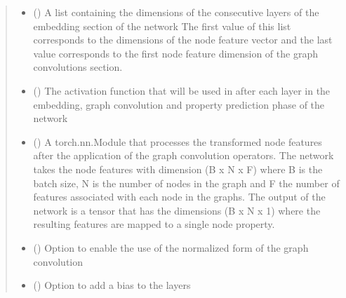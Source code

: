 \documentclass[letterpaper,10pt,english]{sphinxmanual}
\begin{document}
\begin{fulllineitems}
\begin{quote}
\begin{description}
\begin{itemize}
\item {} 
 () \textendash{} A list containing the dimensions of the consecutive layers of the embedding section of the network
The first value of this list corresponds to the dimensions of the node feature vector and the last
value corresponds to the first node feature dimension of the graph convolutions section.

\item {} 
 () \textendash{} The activation function that will be used in after each layer in the embedding, graph convolution
and property prediction phase of the network

\item {} 
 () \textendash{} A torch.nn.Module that processes the transformed node features after the application
of the graph convolution operators. The network takes the node features with dimension
(B x N x F) where B is the batch size, N is the number of nodes in the graph and F
the number of features associated with each node in the graphs. The output of the network
is a tensor that has the dimensions (B x N x 1) where the resulting features are
mapped to a single node property.

\item {} 
 (\sphinxstyleliteralemphasis{\sphinxupquote{, }}) \textendash{} Option to enable the use of the normalized form of the graph convolution

\item {} 
 (\sphinxstyleliteralemphasis{\sphinxupquote{, }}) \textendash{} Option to add a bias to the layers

\end{itemize}

\end{description}\end{quote}


\end{fulllineitems}
\end{document}
